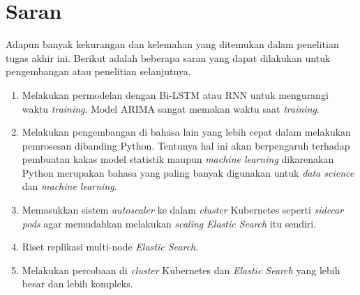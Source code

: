 \section{Saran}
Adapun banyak kekurangan dan kelemahan yang ditemukan dalam penelitian tugas akhir ini. Berikut adalah beberapa saran yang dapat dilakukan untuk pengembangan atau penelitian selanjutnya.
\begin{enumerate}
    \item Melakukan permodelan dengan Bi-LSTM atau RNN untuk mengurangi waktu \textit{training}. Model ARIMA sangat memakan waktu saat \textit{training}.
    \item Melakukan pengembangan di bahasa lain yang lebih cepat dalam melakukan pemrosesan dibanding Python. Tentunya hal ini akan berpengaruh terhadap pembuatan kakas model statistik maupun \textit{machine learning} dikarenakan Python merupakan bahasa yang paling banyak digunakan untuk \textit{data science} dan \textit{machine learning}.
    \item Memasukkan sistem \textit{autoscaler} ke dalam \textit{cluster} Kubernetes seperti \textit{sidecar pods} agar memudahkan melakukan \textit{scaling Elastic Search} itu sendiri.
    \item Riset replikasi multi-node \textit{Elastic Search}. 
    \item Melakukan percobaan di \textit{cluster} Kubernetes dan \textit{Elastic Search} yang lebih besar dan lebih kompleks.
\end{enumerate}